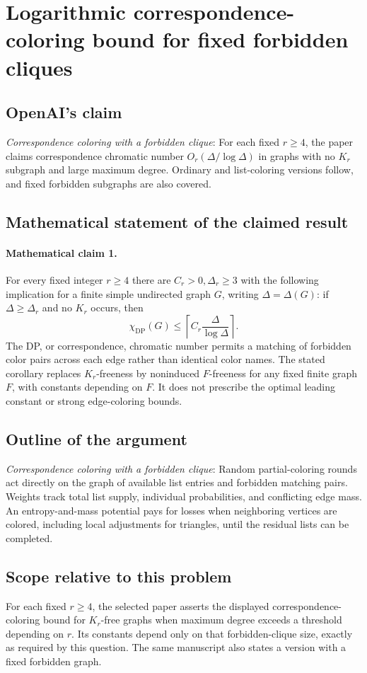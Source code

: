 \documentclass[11pt]{article}
\begin{document}
\section*{Logarithmic correspondence-coloring bound for fixed forbidden cliques}

\subsection{OpenAI's claim}
\textit{Correspondence coloring with a forbidden clique}: For each fixed $r\ge4$, the paper claims correspondence chromatic number $O_r(\Delta/\log\Delta)$ in graphs with no $K_r$ subgraph and large maximum degree. Ordinary and list-coloring versions follow, and fixed forbidden subgraphs are also covered.

\subsection{Mathematical statement of the claimed result}
\paragraph{Mathematical claim 1.} For every fixed integer $r\ge4$ there are $C_r>0,\Delta_r\ge3$ with the following implication for a finite simple undirected graph $G$, writing $\Delta=\Delta(G)$: if $\Delta\ge\Delta_r$ and no $K_r$ occurs, then \[\chi_{\mathrm{DP}}(G)\le\left\lceil C_r\frac\Delta{\log\Delta}\right\rceil.\] The DP, or correspondence, chromatic number permits a matching of forbidden color pairs across each edge rather than identical color names. The stated corollary replaces $K_r$-freeness by noninduced $F$-freeness for any fixed finite graph $F$, with constants depending on $F$. It does not prescribe the optimal leading constant or strong edge-coloring bounds.

\subsection{Outline of the argument}
\textit{Correspondence coloring with a forbidden clique}: Random partial-coloring rounds act directly on the graph of available list entries and forbidden matching pairs. Weights track total list supply, individual probabilities, and conflicting edge mass. An entropy-and-mass potential pays for losses when neighboring vertices are colored, including local adjustments for triangles, until the residual lists can be completed.

\subsection{Scope relative to this problem}
For each fixed $r\ge4$, the selected paper asserts the displayed correspondence-coloring bound for $K_r$-free graphs when maximum degree exceeds a threshold depending on $r$. Its constants depend only on that forbidden-clique size, exactly as required by this question. The same manuscript also states a version with a fixed forbidden graph.
\end{document}
